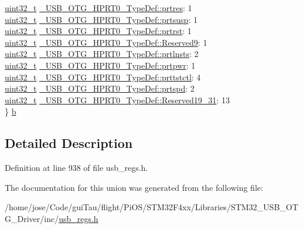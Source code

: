 \begin{DoxyCompactItemize}
\begin{tabbing}
\>\hyperlink{stdint_8h_a435d1572bf3f880d55459d9805097f62}{uint32\_t} \hyperlink{group___u_s_b___o_t_g___d_r_i_v_e_r_ga159a812d06243cc7e536c4439ca4812b}{\_USB\_OTG\_HPRT0\_TypeDef::prtres}: 1\\
\>\hyperlink{stdint_8h_a435d1572bf3f880d55459d9805097f62}{uint32\_t} \hyperlink{group___u_s_b___o_t_g___d_r_i_v_e_r_gaf714b32bdd6fe785663dc5bebc92ee0e}{\_USB\_OTG\_HPRT0\_TypeDef::prtsusp}: 1\\
\>\hyperlink{stdint_8h_a435d1572bf3f880d55459d9805097f62}{uint32\_t} \hyperlink{group___u_s_b___o_t_g___d_r_i_v_e_r_ga4511b9044f1fa4b5fb1127e8bc723bbf}{\_USB\_OTG\_HPRT0\_TypeDef::prtrst}: 1\\
\>\hyperlink{stdint_8h_a435d1572bf3f880d55459d9805097f62}{uint32\_t} \hyperlink{group___u_s_b___o_t_g___d_r_i_v_e_r_gaaea15a924b1b3e769dabc7cfcab7294f}{\_USB\_OTG\_HPRT0\_TypeDef::Reserved9}: 1\\
\>\hyperlink{stdint_8h_a435d1572bf3f880d55459d9805097f62}{uint32\_t} \hyperlink{group___u_s_b___o_t_g___d_r_i_v_e_r_ga1eb1bfa9b25d1d632b5a744db9fcc7e5}{\_USB\_OTG\_HPRT0\_TypeDef::prtlnsts}: 2\\
\>\hyperlink{stdint_8h_a435d1572bf3f880d55459d9805097f62}{uint32\_t} \hyperlink{group___u_s_b___o_t_g___d_r_i_v_e_r_gab6199aadb1043eb15c2814bf6985fefb}{\_USB\_OTG\_HPRT0\_TypeDef::prtpwr}: 1\\
\>\hyperlink{stdint_8h_a435d1572bf3f880d55459d9805097f62}{uint32\_t} \hyperlink{group___u_s_b___o_t_g___d_r_i_v_e_r_gaa103b41b4bc60256a25f3c9cd541f2fc}{\_USB\_OTG\_HPRT0\_TypeDef::prttstctl}: 4\\
\>\hyperlink{stdint_8h_a435d1572bf3f880d55459d9805097f62}{uint32\_t} \hyperlink{group___u_s_b___o_t_g___d_r_i_v_e_r_gac4a7f33605ec1bf4c6d9bf5127dfd6b4}{\_USB\_OTG\_HPRT0\_TypeDef::prtspd}: 2\\
\>\hyperlink{stdint_8h_a435d1572bf3f880d55459d9805097f62}{uint32\_t} \hyperlink{group___u_s_b___o_t_g___d_r_i_v_e_r_ga985d93249d26d1bba1e829f325c55a40}{\_USB\_OTG\_HPRT0\_TypeDef::Reserved19\_31}: 13\\
\} \hyperlink{group___u_s_b___o_t_g___d_r_i_v_e_r_gaf2bfbdba4057193ae92d8d95b079e664}{b}\\

\end{tabbing}\end{DoxyCompactItemize}


\subsection{Detailed Description}


Definition at line 938 of file usb\-\_\-regs.\-h.



The documentation for this union was generated from the following file\-:\begin{DoxyCompactItemize}
\item 
/home/jose/\-Code/gui\-Tau/flight/\-Pi\-O\-S/\-S\-T\-M32\-F4xx/\-Libraries/\-S\-T\-M32\-\_\-\-U\-S\-B\-\_\-\-O\-T\-G\-\_\-\-Driver/inc/\hyperlink{_s_t_m32_f4xx_2_libraries_2_s_t_m32___u_s_b___o_t_g___driver_2inc_2usb__regs_8h}{usb\-\_\-regs.\-h}\end{DoxyCompactItemize}
